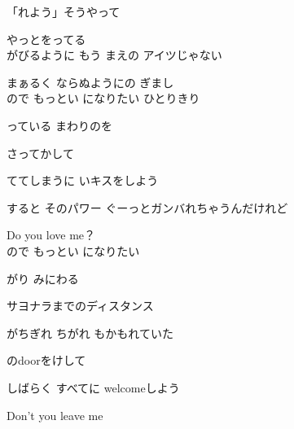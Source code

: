 {「れよう」そうやって

やっとをってる
\\

がびるように もう まえの アイツじゃない

まぁるく ならぬようにの ぎまし
\\

ので もっとい になりたい ひとりきり

っている まわりのを

さってかして

 ててしまうに いキスをしよう

すると そのパワー ぐーっとガンバれちゃうんだけれど

Do you love me？
\\

ので もっとい になりたい

がり みにわる

サヨナラまでのディスタンス

がちぎれ ちがれ もかもれていた

のdoorをけして

しばらく すべてに welcomeしよう

Don't you leave me

}
